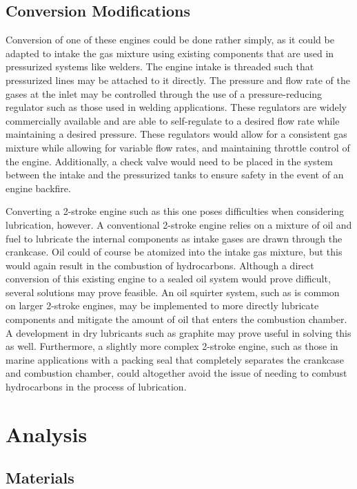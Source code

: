 \documentclass[conf]{new-aiaa}
\begin{document}
\subsection{Conversion Modifications}
%
Conversion of one of these engines could be done rather simply, as it could be adapted to intake the gas mixture using existing components that are used in pressurized systems like welders. The engine intake is threaded such that pressurized lines may be attached to it directly. The pressure and flow rate of the gases at the inlet may be controlled through the use of a pressure-reducing regulator such as those used in welding applications. These regulators are widely commercially available and are able to self-regulate to a desired flow rate while maintaining a desired pressure. These regulators would allow for a consistent gas mixture while allowing for variable flow rates, and maintaining throttle control of the engine. Additionally, a check valve would need to be placed in the system between the intake and the pressurized tanks to ensure safety in the event of an engine backfire.

Converting a 2-stroke engine such as this one poses difficulties when considering lubrication, however. A conventional 2-stroke engine relies on a mixture of oil and fuel to lubricate the internal components as intake gases are drawn through the crankcase. Oil could of course be atomized into the intake gas mixture, but this would again result in the combustion of hydrocarbons. Although a direct conversion of this existing engine to a sealed oil system would prove difficult, several solutions may prove feasible. An oil squirter system, such as is common on larger 2-stroke engines, may be implemented to more directly lubricate components and mitigate the amount of oil that enters the combustion chamber. A development in dry lubricants such as graphite may prove useful in solving this as well. Furthermore, a slightly more complex 2-stroke engine, such as those in marine applications with a packing seal that completely separates the crankcase and combustion chamber, could altogether avoid the issue of needing to combust hydrocarbons in the process of lubrication.
\section{Analysis}
\subsection{Materials}
\end{document}
